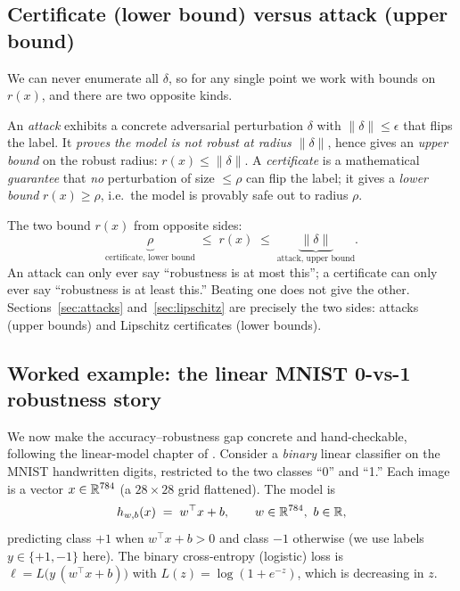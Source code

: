 \subsection{Certificate (lower bound) versus attack (upper bound)}
\label{sub:cert-vs-attack}

We can never enumerate all $\delta$, so for any single point we work with bounds on $r(x)$, and there are two opposite kinds.

\begin{definition}
An \emph{attack} exhibits a concrete adversarial perturbation $\delta$ with $\|\delta\|\le\epsilon$ that flips the label. It \emph{proves the model is not robust at radius $\|\delta\|$}, hence gives an \emph{upper bound} on the robust radius: $r(x)\le\|\delta\|$. A \emph{certificate} is a mathematical \emph{guarantee} that \emph{no} perturbation of size $\le\rho$ can flip the label; it gives a \emph{lower bound} $r(x)\ge\rho$, i.e.\ the model is provably safe out to radius $\rho$.
\end{definition}

The two bound $r(x)$ from opposite sides:
\[
  \underbrace{\rho}_{\text{certificate, lower bound}} \;\le\; r(x) \;\le\; \underbrace{\|\delta\|}_{\text{attack, upper bound}}.
\]
An attack can only ever say ``robustness is at most this''; a certificate can only ever say ``robustness is at least this.'' Beating one does not give the other. Sections~\ref{sec:attacks} and~\ref{sec:lipschitz} are precisely the two sides: attacks (upper bounds) and Lipschitz certificates (lower bounds).

\subsection{Worked example: the linear MNIST 0-vs-1 robustness story}
\label{sub:mnist01}

We now make the accuracy--robustness gap concrete and hand-checkable, following the linear-model chapter of \citet{kolter2018adversarial}. Consider a \emph{binary} linear classifier on the MNIST handwritten digits, restricted to the two classes ``0'' and ``1.'' Each image is a vector $x\in\mathbb{R}^{784}$ (a $28\times28$ grid flattened). The model is
\[
  h_{w,b}(x) \;=\; w^\top x + b, \qquad w\in\mathbb{R}^{784},\ b\in\mathbb{R},
\]
predicting class $+1$ when $w^\top x + b > 0$ and class $-1$ otherwise (we use labels $y\in\{+1,-1\}$ here). The binary cross-entropy (logistic) loss is $\ell = L\big(y\,(w^\top x+b)\big)$ with $L(z)=\log(1+e^{-z})$, which is decreasing in $z$.

